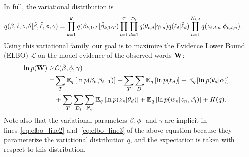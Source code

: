 
In full, the variational distribution is
\begin{align}
  q(\beta, \ell, z, \theta | & \tilde{\beta}, \tilde{\ell}, \phi, \gamma) = \prod_{k=1}^K q(\beta_{k,1:T} | \tilde{\beta}_{k,1:T})
  \prod_{t=1}^T \prod_{d=1}^{D_t} q(\theta_{t,d} | \gamma_{t,d})
  q(\ell_{d} | \tilde{\ell}_{d})
  \prod_{n=1}^{N_{t,d}} q(z_{t,d,n} | \phi_{t,d,n}). \nonumber
\end{align}
Using this variational family, our goal is to maximize the Evidence Lower Bound (ELBO) $\mathcal{L}$ on the model evidence of the observed words $\textbf{W}$:
\begin{align}
  \label{eq:elbo}
  \ln p(\textbf{W}) \geq & \mathcal{L}(\tilde{\beta}, \phi, \gamma) \\
  = & \sum_T \mathbb{E}_q\left[\ln p(\beta_{t} | \beta_{t-1})\right] 
  + \sum_{T} \sum_{D_t} \mathbb{E}_q\left[\ln p(\ell_{d})\right] + \mathbb{E}_q\left[\ln
    p(\theta_{d} | \alpha)\right] \label{eq:elbo_line2} \\ 
  & + \sum_{T} \sum_{D_t} \sum_{N_d} \mathbb{E}_q\left[\ln p( z_n | \theta_d)\right] + \mathbb{E}_q\left[\ln p(w_n | z_n, \beta_t)\right]
  + H(q). \label{eq:elbo_line3}
\end{align}
Note also that the variational parameters $\tilde{\beta}, \phi,$ and $\gamma$
are implicit in lines~\ref{eq:elbo_line2} and~\ref{eq:elbo_line3} of
the above equation because they parameterize the variational
distribution $q$, and the expectation is taken with respect to this distribution.

